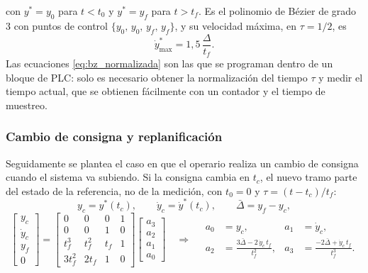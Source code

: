 con $y^* = y_0$ para $t < t_0$ y $y^* = y_f$ para $t > t_f$. Es el polinomio de
Bézier de grado 3 con puntos de control $\{y_0,\, y_0,\, y_f,\, y_f\}$, y su
velocidad máxima, en $\tau = 1/2$, es
\begin{equation}
\dot{y}^*_{\max} = 1{,}5\,\frac{\Delta}{t_f} .
\label{eq:bz_vmax}
\end{equation}
Las ecuaciones \eqref{eq:bz_normalizada} son las que se programan dentro de un bloque
de PLC: solo es necesario obtener la normalización del tiempo $\tau$ y medir el
tiempo actual, que se obtienen fácilmente con un contador y el tiempo de muestreo.
\subsubsection{Cambio de consigna y replanificación}
\label{subsec:bz_replanificacion}
Seguidamente se plantea el caso en que el operario realiza un cambio de consigna
cuando el sistema va subiendo.
Si la consigna cambia en $t_c$, el nuevo tramo parte del estado de la referencia,
no de la medición, con $t_0 = 0$ y $\tau = (t - t_c)/t_f$:
\begin{equation}
y_c = y^*(t_c) , \qquad \dot{y}_c = \dot{y}^*(t_c) , \qquad \bar{\Delta} = y_f - y_c ,
\label{eq:bz_estado_c}
\end{equation}
\begin{equation}
\begin{bmatrix} y_c \\ \dot{y}_c \\ y_f \\ 0 \end{bmatrix}
=
\begin{bmatrix}
0 & 0 & 0 & 1 \\
0 & 0 & 1 & 0 \\
t_f^3 & t_f^2 & t_f & 1 \\
3t_f^2 & 2t_f & 1 & 0
\end{bmatrix}
\begin{bmatrix} a_3 \\ a_2 \\ a_1 \\ a_0 \end{bmatrix}
\quad\Longrightarrow\quad
\begin{aligned}
a_0 &= y_c , & a_1 &= \dot{y}_c , \\
a_2 &= \frac{3\bar{\Delta} - 2\,\dot{y}_c\,t_f}{t_f^2} , & a_3 &= \frac{-2\bar{\Delta} + \dot{y}_c\,t_f}{t_f^3} .
\end{aligned}
\label{eq:bz_sistema_c}
\end{equation}
